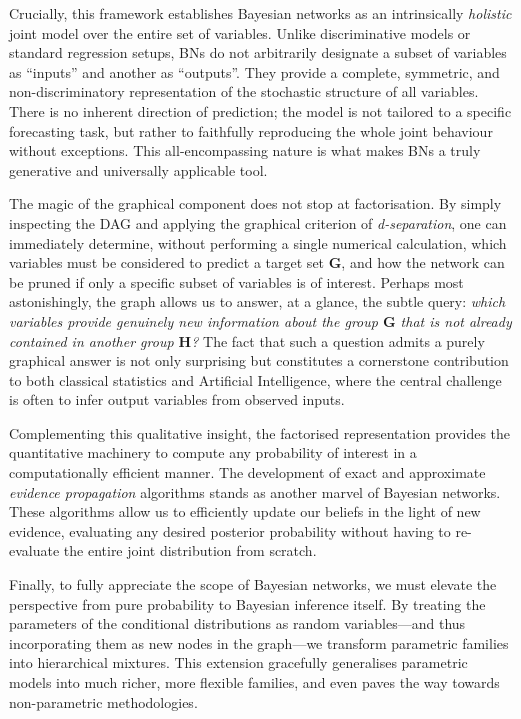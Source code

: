 Crucially, this framework establishes Bayesian networks as an intrinsically \emph{holistic} joint model over the entire set of variables. Unlike discriminative models or standard regression setups, BNs do not arbitrarily designate a subset of variables as ``inputs'' and another as ``outputs''. They provide a complete, symmetric, and non-discriminatory representation of the stochastic structure of all variables. There is no inherent direction of prediction; the model is not tailored to a specific forecasting task, but rather to faithfully reproducing the whole joint behaviour without exceptions. This all-encompassing nature is what makes BNs a truly generative and universally applicable tool.

The magic of the graphical component does not stop at factorisation. By simply inspecting the DAG and applying the graphical criterion of \emph{d-separation}, one can immediately determine, without performing a single numerical calculation, which variables must be considered to predict a target set \(\mathbf{G}\), and how the network can be pruned if only a specific subset of variables is of interest. Perhaps most astonishingly, the graph allows us to answer, at a glance, the subtle query: \emph{which variables provide genuinely new information about the group \(\mathbf{G}\) that is not already contained in another group \(\mathbf{H}\)?} The fact that such a question admits a purely graphical answer is not only surprising but constitutes a cornerstone contribution to both classical statistics and Artificial Intelligence, where the central challenge is often to infer output variables from observed inputs.

Complementing this qualitative insight, the factorised representation provides the quantitative machinery to compute any probability of interest in a computationally efficient manner. The development of exact and approximate \emph{evidence propagation} algorithms stands as another marvel of Bayesian networks. These algorithms allow us to efficiently update our beliefs in the light of new evidence, evaluating any desired posterior probability without having to re-evaluate the entire joint distribution from scratch.

Finally, to fully appreciate the scope of Bayesian networks, we must elevate the perspective from pure probability to Bayesian inference itself. By treating the parameters of the conditional distributions as random variables—and thus incorporating them as new nodes in the graph—we transform parametric families into hierarchical mixtures. This extension gracefully generalises parametric models into much richer, more flexible families, and even paves the way towards non-parametric methodologies.

